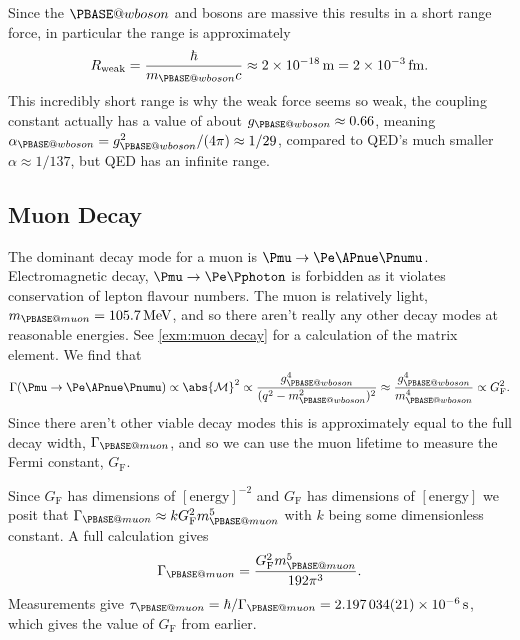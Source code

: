 \documentclass[fleqn]{NotesClass}
\makeatletter
\newcommand{\Pwboson}{\ensuremath{\PBASE@wboson}}
\newcommand{\PW}{\Pwboson}
\newcommand{\Pmuonneutral}{\ensuremath{\PBASE@muon}}
\newcommand*{\matrixelement}{\mathcal{M}}
\newcommand*{\fermiconst}{G_{\mathrm{F}}}
\makeatother
\begin{document}
    Since the \PW{} and \PZ{} bosons are massive this results in a short range force, in particular the range is approximately
    \begin{equation}
        R_{\text{weak}} = \frac{\hbar}{m_{\PW} c} \approx \qty{2e-18}{\metre} = \qty{2e-3}{\femto\metre}.
    \end{equation}
    This incredibly short range is why the weak force seems so weak, the coupling constant actually has a value of about \(g_{\PW} \approx 0.66\), meaning \(\alpha_{\PW} = g_{\PW}^2/(4\pi) \approx 1/29\), compared to QED's much smaller \(\alpha \approx 1/137\), but QED has an infinite range.
    
    \subsection{Muon Decay}
    The dominant decay mode for a muon is \(\Pmu \to \Pe\APnue\Pnumu\).
    Electromagnetic decay, \(\Pmu\to\Pe\Pphoton\) is forbidden as it violates conservation of lepton flavour numbers.
    The muon is relatively light, \(m_{\Pmuonneutral} = \qty{105.7}{\mega\electronvolt}\), and so there aren't really any other decay modes at reasonable energies.
    See \cref{exm:muon decay} for a calculation of the matrix element.
    We find that
    \begin{equation}
        \Gamma(\Pmu \to \Pe\APnue\Pnumu) \propto \abs{\matrixelement}^2 \propto \frac{g_{\PW}^4}{(q^2 - m_{\PW}^2)^2} \approx \frac{g_{\PW}^4}{m_{\PW}^4} \propto \fermiconst^2.
    \end{equation}
    Since there aren't other viable decay modes this is approximately equal to the full decay width, \(\Gamma_{\Pmuonneutral}\), and so we can use the muon lifetime to measure the Fermi constant, \(\fermiconst\).
    
    Since \(\fermiconst\) has dimensions of \([\text{energy}]^{-2}\) and \(\fermiconst\) has dimensions of \([\text{energy}]\) we posit that \(\Gamma_{\Pmuonneutral} \approx k\fermiconst^2m_{\Pmuonneutral}^5\) with \(k\) being some dimensionless constant.
    A full calculation gives
    \begin{equation}
        \Gamma_{\Pmuonneutral} = \frac{\fermiconst^2m_{\Pmuonneutral}^5}{192\pi^3}.
    \end{equation}
    Measurements give \(\tau_{\Pmuonneutral} = \hbar/\Gamma_{\Pmuonneutral} = \qty{2.197034(21)e-6}{\second}\), which gives the value of \(\fermiconst\) from earlier.
    
\end{document}
